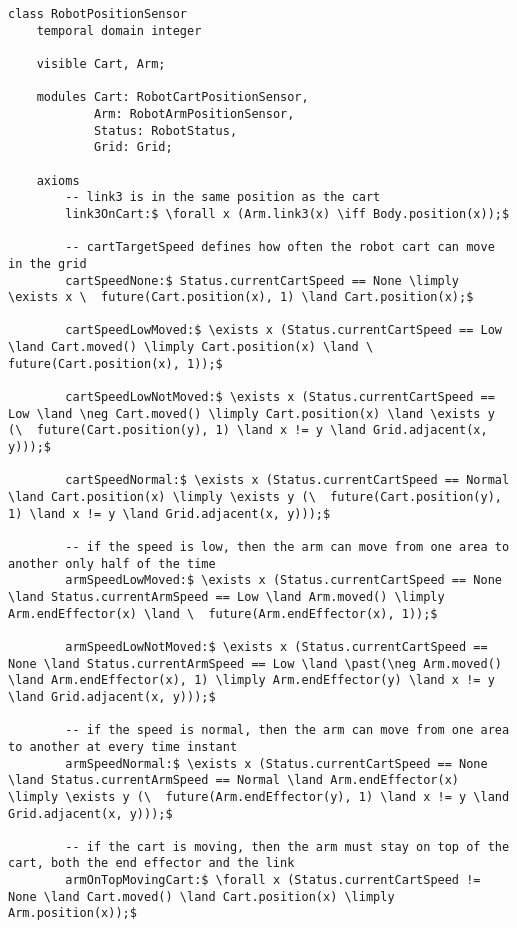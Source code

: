 \begin{lstlisting}[fontadjust, mathescape, frame=single] 
class RobotPositionSensor
    temporal domain integer

    visible Cart, Arm;

    modules Cart: RobotCartPositionSensor,
            Arm: RobotArmPositionSensor,
            Status: RobotStatus,
            Grid: Grid;

    axioms
        -- link3 is in the same position as the cart
        link3OnCart:$ \forall x (Arm.link3(x) \iff Body.position(x));$

        -- cartTargetSpeed defines how often the robot cart can move in the grid
        cartSpeedNone:$ Status.currentCartSpeed == None \limply \exists x \  future(Cart.position(x), 1) \land Cart.position(x);$

        cartSpeedLowMoved:$ \exists x (Status.currentCartSpeed == Low \land Cart.moved() \limply Cart.position(x) \land \  future(Cart.position(x), 1));$

        cartSpeedLowNotMoved:$ \exists x (Status.currentCartSpeed == Low \land \neg Cart.moved() \limply Cart.position(x) \land \exists y (\  future(Cart.position(y), 1) \land x != y \land Grid.adjacent(x, y)));$

        cartSpeedNormal:$ \exists x (Status.currentCartSpeed == Normal \land Cart.position(x) \limply \exists y (\  future(Cart.position(y), 1) \land x != y \land Grid.adjacent(x, y)));$

        -- if the speed is low, then the arm can move from one area to another only half of the time
        armSpeedLowMoved:$ \exists x (Status.currentCartSpeed == None \land Status.currentArmSpeed == Low \land Arm.moved() \limply Arm.endEffector(x) \land \  future(Arm.endEffector(x), 1));$

        armSpeedLowNotMoved:$ \exists x (Status.currentCartSpeed == None \land Status.currentArmSpeed == Low \land \past(\neg Arm.moved() \land Arm.endEffector(x), 1) \limply Arm.endEffector(y) \land x != y \land Grid.adjacent(x, y)));$

        -- if the speed is normal, then the arm can move from one area to another at every time instant
        armSpeedNormal:$ \exists x (Status.currentCartSpeed == None \land Status.currentArmSpeed == Normal \land Arm.endEffector(x) \limply \exists y (\  future(Arm.endEffector(y), 1) \land x != y \land Grid.adjacent(x, y)));$

        -- if the cart is moving, then the arm must stay on top of the cart, both the end effector and the link
        armOnTopMovingCart:$ \forall x (Status.currentCartSpeed != None \land Cart.moved() \land Cart.position(x) \limply Arm.position(x));$


\end{lstlisting}
